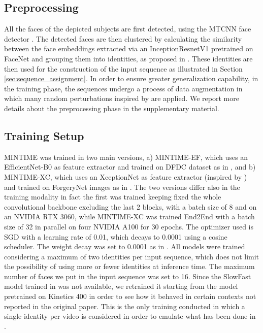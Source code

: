 \documentclass[10pt,twocolumn,letterpaper]{article}
\begin{document}
\subsection{Preprocessing}
All the faces of the depicted subjects are first detected, using the MTCNN face detector \cite{mtcnn}. The detected faces are then clustered by calculating the similarity between the face embeddings extracted via an InceptionResnetV1 pretrained on FaceNet\cite{facenet} and grouping them into identities, as proposed in \cite{preprocessing}. These identities are then used for the construction of the input sequence as illustrated in Section \ref{sec:sequence_assignment}. In order to ensure greater generalization capability, in the training phase, the sequences undergo a process of data augmentation in which many random perturbations inspired by \cite{forgerynet} are applied. We report more details about the preprocessing phase in the supplementary material.

\subsection{Training Setup}
MINTIME was trained in two main versions, a) MINTIME-EF, which uses an EfficientNet-B0\cite{efficientnet} as feature extractor and trained on DFDC dataset\cite{DFDC} as in \cite{10.1007/978-3-031-06433-3_19}, and b) MINTIME-XC, which uses an XceptionNet\cite{xception} as feature extractor (inspired by \cite{10.1145/3549555.3549588}) and trained on ForgeryNet images as in \cite{forgerynet}.
The two versions differ also in the training modality in fact the first was trained keeping fixed the whole convolutional backbone excluding the last 2 blocks, with a batch size of 8 and on an NVIDIA RTX 3060, while MINTIME-XC was trained End2End with a batch size of 32 in parallel on four NVIDIA A100 for 30 epochs.
The optimizer used is SGD with a learning rate of 0.01, which decays to 0.0001 using a cosine scheduler. The weight decay was set to 0.0001 as in \cite{Bertasius2021IsSA}.
All models were trained considering a maximum of two identities per input sequence, which does not limit the possibility of using more or fewer identities at inference time. The maximum number of faces we put in the input sequence was set to 16. Since the SlowFast\cite{Feichtenhofer_2019_ICCV} model trained in \cite{forgerynet} was not available, we retrained it starting from the model pretrained on Kinetics 400\cite{kinetics} in order to see how it behaved in certain contexts not reported in the original paper. This is the only training conducted in which a single identity per video is considered in order to emulate what has been done in \cite{forgerynet}.
\end{document}
